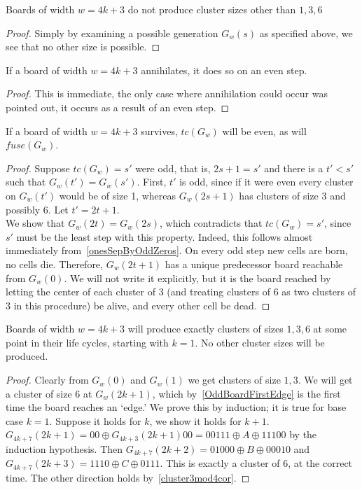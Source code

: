 \documentclass[12pt,letterpaper]{article}
\begin{document}
\begin{cor}\label{cluster3mod4cor}
  Boards of width $w=4k+3$ do not produce cluster sizes other than $1,3,6$
\end{cor}
\begin{proof}
  Simply by examining a possible generation $G_w(s)$ as specified above, we see that no other size is possible.
\end{proof}

\begin{cor}\label{3mod4annihilateOnEven}
  If a board of width $w=4k+3$ annihilates, it does so on an even step.
\end{cor}
\begin{proof}
  This is immediate, the only case where annihilation could occur was pointed out, it occurs as a result of an even step.
\end{proof}
\begin{prop}\label{cycleOnEven3mod4}
  If a board of width $w=4k+3$ survives, $tc(G_w)$ will be even, as will $fuse(G_w)$. 
\end{prop}
\begin{proof}
  Suppose $tc(G_w)=s'$ were odd, that is, $2s+1=s'$ and there is a $t'<s'$ such that $G_w(t')=G_w(s')$. First, $t'$ is odd, since if it were even every cluster on $G_w(t')$ would be of size 1, whereas $G_w(2s+1)$ has clusters of size 3 and possibly 6. Let $t'=2t+1$. \\
  We show that $G_w(2t)=G_w(2s)$, which contradicts that $tc(G_w)=s'$, since $s'$ must be the least step with this property. Indeed, this follows almost immediately from~\cref{onesSepByOddZeros}. On every odd step new cells are born, no cells die. Therefore, $G_w(2t+1)$ has a unique predecessor board reachable from $G_w(0)$. We will not write it explicitly, but it is the board reached by letting the center of each cluster of 3 (and treating clusters of 6 as two clusters of 3 in this procedure) be alive, and every other cell be dead.
\end{proof}

\begin{prop}\label{cluster3mod4} %
  Boards of width $w=4k+3$ will produce exactly clusters of sizes $1,3,6$ at some point in their life cycles, starting with $k=1$. No other cluster sizes will be produced.
\end{prop}
\begin{proof}
  Clearly from $G_w(0)$ and $G_w(1)$ we get clusters of size $1,3$. We will get a cluster of size $6$ at $G_w(2k+1)$, which by~\cref{OddBoardFirstEdge} is the first time the board reaches an `edge.' We prove this by induction; it is true for base case $k=1$. Suppose it holds for $k$, we show it holds for $k+1$. $G_{4k+7}(2k+1) = 00\oplus G_{4k+3}(2k+1)00 = 00111\oplus A\oplus 11100$ by the induction hypothesis. Then $G_{4k+7}(2k+2)=01000\oplus B\oplus 00010$ and $G_{4k+7}(2k+3)=1110\oplus C\oplus 0111$. This is exactly a cluster of 6, at the correct time. The other direction holds by~\cref{cluster3mod4cor}.
\end{proof}
\end{document}
